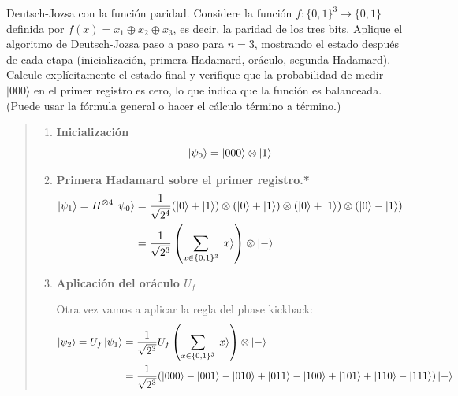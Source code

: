 {\bfseries

Deutsch-Jozsa con la función paridad. Considere la función $f:\{0,1\}^3 \rightarrow \{0,1\}$ definida por $f(x) = x_1 \oplus x_2 \oplus x_3$, es decir, la paridad de los tres bits.
Aplique el algoritmo de Deutsch-Jozsa paso a paso para $n=3$, mostrando el estado después de cada etapa (inicialización, primera Hadamard, oráculo, segunda Hadamard).
Calcule explícitamente el estado final y verifique que la probabilidad de medir $\vert 000 \rangle$ en el primer registro es cero, lo que indica que la función es balanceada. (Puede usar la fórmula general o hacer el cálculo término a término.)}

\vspace{.5cm}
\begin{quote}

\begin{enumerate}
    \item \textbf{Inicialización }
        $$
        \ket{\psi_0} = \ket{000} \otimes \ket{1}
        $$

    \item \textbf{Primera Hadamard sobre el primer registro.*} 
        \begin{align*}
            \ket{\psi_1} = H^{\otimes 4} \ket{\psi_{0}} &= \frac{1}{\sqrt{2^4}} (\ket{0}+\ket{1})
            \otimes (\ket{0}+\ket{1})\otimes (\ket{0}+\ket{1}) \otimes (\ket{0}-\ket{1}) \\
                                                        &= \frac{1}{\sqrt{2^3}} \left(\sum _{x
                                                                \in \{0,1\}^3} \ket{x} \right)
                                                                \otimes \ket{-}
        \end{align*}

    \item \textbf{Aplicación del oráculo $U_f$}

        Otra vez vamos a aplicar la regla del phase kickback:
        \begin{align*}
            \ket{\psi_2} = U_f \ket{\psi_1} &= \frac{1}{\sqrt{2^3}} U_f \left(\sum _{x
                                                                \in \{0,1\}^3} \ket{x} \right)
                                                                \otimes \ket{-} \\ 
                                            &= \frac{1}{\sqrt{2^3}} (\ket{000} - \ket{001} - \ket{010} +
                                            \ket{011} - \ket{100} + \ket{101} + \ket{110} -
                                            \ket{111} )\ket{-}
        \end{align*}


\end{enumerate}
\end{quote}
